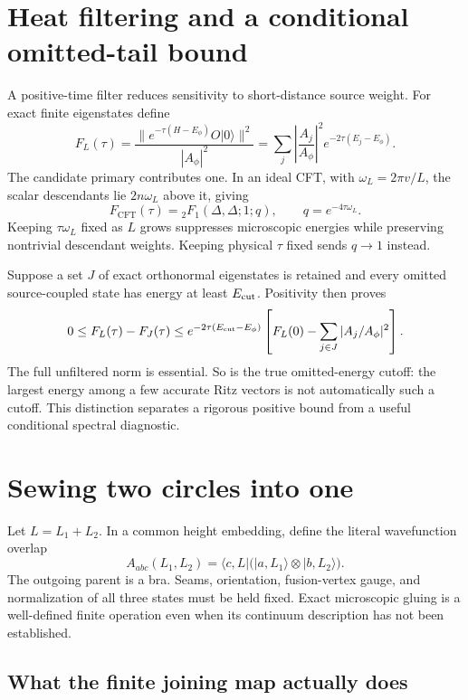 \section{Heat filtering and a conditional omitted-tail bound}

A positive-time filter reduces sensitivity to short-distance source
weight. For exact finite eigenstates define
\[
 F_L(\tau)=
 \frac{\|e^{-\tau(H-E_\phi)}O|0\rangle\|^2}{|A_\phi|^2}
 =\sum_j\left|\frac{A_j}{A_\phi}\right|^2
       e^{-2\tau(E_j-E_\phi)}.
\]
The candidate primary contributes one. In an ideal CFT, with
$\omega_L=2\pi v/L$, the scalar descendants lie $2n\omega_L$ above
it, giving
\begin{equation}
 F_{\mathrm{CFT}}(\tau)=
 {}_2F_1(\Delta,\Delta;1;q),\qquad
 q=e^{-4\tau\omega_L}.
 \label{eq:filtered-hypergeometric}
\end{equation}
Keeping $\tau\omega_L$ fixed as $L$ grows suppresses microscopic
energies while preserving nontrivial descendant weights. Keeping
physical $\tau$ fixed sends $q\to1$ instead.

Suppose a set $J$ of exact orthonormal eigenstates is retained and every
omitted source-coupled state has energy at least $E_{\rm cut}$. Positivity
then proves
\[
 0\leq F_L(\tau)-F_J(\tau)
 \leq e^{-2\tau(E_{\rm cut}-E_\phi)}
 \left[F_L(0)-\sum_{j\in J}|A_j/A_\phi|^2\right].
\]
The full unfiltered norm is essential. So is the true omitted-energy
cutoff: the largest energy among a few accurate Ritz vectors is not
automatically such a cutoff. This distinction separates a rigorous
positive bound from a useful conditional spectral diagnostic.

\section{Sewing two circles into one}

Let $L=L_1+L_2$. In a common height embedding, define the literal
wavefunction overlap
\[
 A_{abc}(L_1,L_2)=
 \langle c,L|\bigl(|a,L_1\rangle\otimes|b,L_2\rangle\bigr).
\]
The outgoing parent is a bra. Seams, orientation, fusion-vertex gauge,
and normalization of all three states must be held fixed. Exact
microscopic gluing is a well-defined finite operation even when its
continuum description has not been established.

\subsection{What the finite joining map actually does}
\label{sec:overlap-literal-joining}

